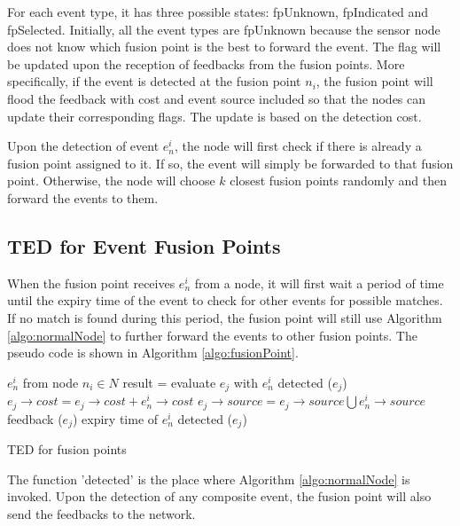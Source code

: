 For each event type, it has three possible states: fpUnknown, fpIndicated and fpSelected. Initially, all the event types are fpUnknown because the sensor node does not know which fusion point is the best to forward the event. The flag will be updated upon the reception of feedbacks from the fusion points. More specifically, if the event is detected at the fusion point \(n_i\), the fusion point will flood the feedback with cost and event source included so that the nodes can update their corresponding flags. The update is based on the detection cost.

Upon the detection of event \(e^i_n\), the node will first check if there is already a fusion point assigned to it. If so, the event will simply be forwarded to that fusion point. Otherwise, the node will choose \(k\) closest fusion points randomly and then forward the events to them.

\subsection{TED for Event Fusion Points}
When the fusion point receives \(e^i_n\) from a node, it will first wait a period of time until the expiry time of the event to check for other events for possible matches. If no match is found during this period, the fusion point will still use Algorithm \ref{algo:normalNode} to further forward the events to other fusion points. The pseudo code is shown in Algorithm \ref{algo:fusionPoint}.

\begin{algorithm}
\begin{algorithmic}
\REQUIRE \(e^i_n\) from node \(n_i\in N\)
			\STATE result = evaluate \(e_j\) with \(e^i_n\)
				\STATE detected (\(e_j\))
				\STATE \(e_j\rightarrow cost=e_j\rightarrow cost+e^i_n\rightarrow cost\)
				\STATE \(e_j\rightarrow source=e_j\rightarrow source\bigcup e^i_n\rightarrow source\)
				\STATE feedback (\(e_j\))
			\ENDIF
		\ENDIF
	\ENDFOR
\REQUIRE expiry time of \(e^i_n\)
	\STATE detected (\(e_j\))
\end{algorithmic}
\caption{TED for fusion points}
\label{algo:fusionPoint}
\end{algorithm}

The function 'detected' is the place where Algorithm \ref{algo:normalNode} is invoked. Upon the detection of any composite event, the fusion point will also send the feedbacks to the network.

